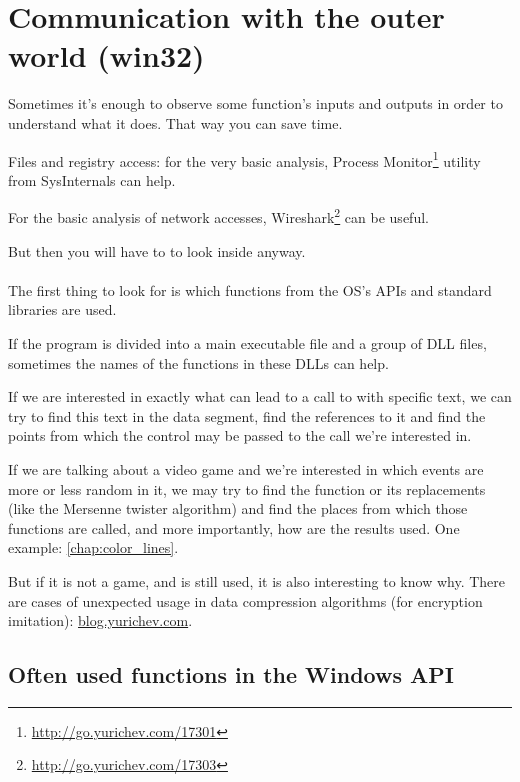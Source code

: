 \section{Communication with the outer world (win32)}

Sometimes it's enough to observe some function's inputs and outputs in order to understand what it does.
That way you can save time.

Files and registry access: 
for the very basic analysis, Process Monitor\footnote{\url{http://go.yurichev.com/17301}}
utility from SysInternals can help.

For the basic analysis of network accesses, Wireshark\footnote{\url{http://go.yurichev.com/17303}} can be useful.

But then you will have to to look inside anyway. \\
\\
The first thing to look for is which functions from the \ac{OS}'s \ac{API}s and standard libraries are used.

If the program is divided into a main executable file and a group of DLL files, sometimes the names of the functions in these DLLs can help.

If we are interested in exactly what can lead to a call to  with specific text, 
we can try to find this text in the data segment, find the references to it and find the points
from which the control may be passed to the  call we're interested in.

If we are talking about a video game and we're interested in which events are more or less random in it,
we may try to find the \rand function or its replacements (like the Mersenne twister algorithm) and find the places
from which those functions are called, and more importantly, how are the results used.
One example: \ref{chap:color_lines}. 

But if it is not a game, and \rand is still used, it is also interesting to know why.
There are cases of unexpected \rand usage in data compression algorithms (for encryption imitation):
\href{http://go.yurichev.com/17221}{blog.yurichev.com}.

\subsection{Often used functions in the Windows API}


